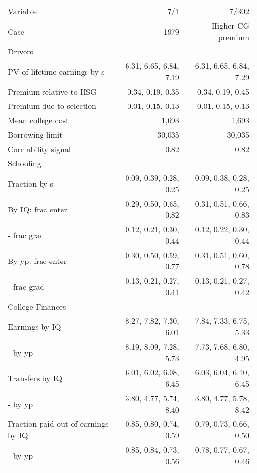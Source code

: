 \begin{tabular}{lrr}
\hline
Variable & 7/1  & 7/302  \\ 
Case & 1979  & Higher CG premium  \\ 
Drivers &   &   \\ 
PV of lifetime earnings by s & 6.31, 6.65, 6.84, 7.19  & 6.31, 6.65, 6.84, 7.29  \\ 
Premium relative to HSG & 0.34, 0.19, 0.35  & 0.34, 0.19, 0.45  \\ 
Premium due to selection & 0.01, 0.15, 0.13  & 0.01, 0.15, 0.13  \\ 
Mean college cost & 1,693  & 1,693  \\ 
Borrowing limit & -30,035  & -30,035  \\ 
Corr ability signal & 0.82  & 0.82  \\ 
\hline
Schooling &   &   \\ 
Fraction by s & 0.09, 0.39, 0.28, 0.25  & 0.09, 0.38, 0.28, 0.25  \\ 
By IQ: frac enter & 0.29, 0.50, 0.65, 0.82  & 0.31, 0.51, 0.66, 0.83  \\ 
- frac grad & 0.12, 0.21, 0.30, 0.44  & 0.12, 0.22, 0.30, 0.44  \\ 
By yp: frac enter & 0.30, 0.50, 0.59, 0.77  & 0.31, 0.51, 0.60, 0.78  \\ 
- frac grad & 0.13, 0.21, 0.27, 0.41  & 0.13, 0.21, 0.27, 0.42  \\ 
\hline
College Finances &   &   \\ 
Earnings by IQ & 8.27, 7.82, 7.30, 6.01  & 7.84, 7.33, 6.75, 5.33  \\ 
- by yp & 8.19, 8.09, 7.28, 5.73  & 7.73, 7.68, 6.80, 4.95  \\ 
Transfers by IQ & 6.01, 6.02, 6.08, 6.45  & 6.03, 6.04, 6.10, 6.45  \\ 
- by yp & 3.80, 4.77, 5.74, 8.40  & 3.80, 4.77, 5.78, 8.42  \\ 
Fraction paid out of earnings by IQ & 0.85, 0.80, 0.74, 0.59  & 0.79, 0.73, 0.66, 0.50  \\ 
- by yp & 0.85, 0.84, 0.73, 0.56  & 0.78, 0.77, 0.67, 0.46  \\ 
\hline
\end{tabular}%
